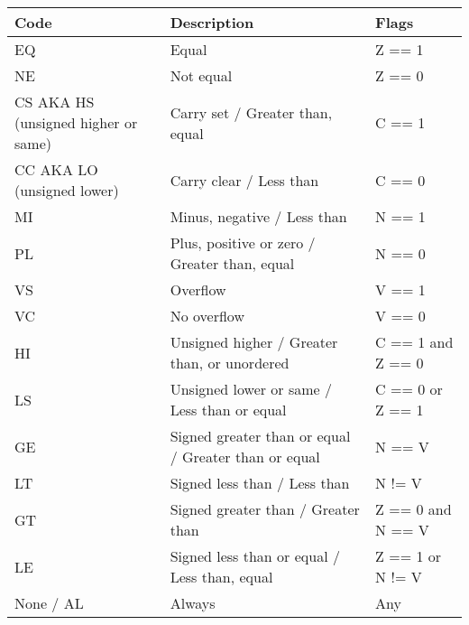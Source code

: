 \begin{center}
\begin{tabular}{ | l | l | l | }
\hline
\cellcolor{blue!25} Code & \cellcolor{blue!25} Description & \cellcolor{blue!25} Flags \\
\hline
EQ & Equal & Z == 1 \\
\hline
NE & Not equal & Z == 0 \\
\hline
CS \ac{AKA} HS (unsigned higher or same) & Carry set / Greater than, equal & C == 1 \\
\hline
CC \ac{AKA} LO (unsigned lower) & Carry clear / Less than & C == 0 \\
\hline
MI & Minus, negative / Less than & N == 1 \\
\hline
PL & Plus, positive or zero / Greater than, equal & N == 0 \\
\hline
VS & Overflow & V == 1 \\
\hline
VC & No overflow & V == 0 \\
\hline
HI & Unsigned higher / Greater than, or unordered & C == 1 and Z == 0 \\
\hline
LS & Unsigned lower or same / Less than or equal & C == 0 or Z == 1 \\
\hline
GE & Signed greater than or equal / Greater than or equal & N == V \\
\hline
LT & Signed less than / Less than & N != V \\
\hline
GT & Signed greater than / Greater than & Z == 0 and N == V \\
\hline
LE & Signed less than or equal / Less than, equal & Z == 1 or N != V \\
\hline
None / AL & Always & Any \\
\hline
\end{tabular}
\end{center}
\fi
